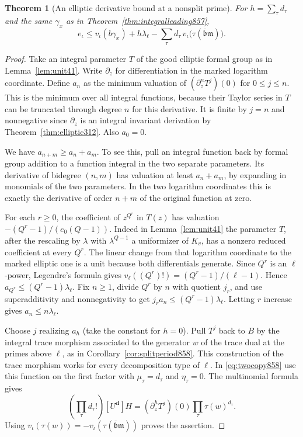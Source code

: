 \documentclass[a4paper,11pt]{article}
\newtheorem{theorem}[proposition]{Theorem}
\theoremstyle{definition}
\theoremstyle{remark}
\numberwithin{equation}{section}
\begin{document}
\begin{theorem}[An elliptic derivative bound at a nonsplit prime]
\leavevmode\label{thm:scalartrace859}
For \(h=\sum_\tau d_\tau\) and the same \(\gamma_x\) as in
Theorem~\ref{thm:integralleading857},
\[
 e_\iota\le v_\iota(b\gamma_x)+h\lambda_\ell
         -\sum_\tau d_\tau\,v_\iota
                 \bigl(\tau(\overline{\mathfrak b}\mathfrak m)\bigr).
\]
\end{theorem}
\begin{proof}
Take an integral parameter \(T\) of the good elliptic formal
group as in Lemma~\ref{lem:unit41}. Write \(\partial_z\) for
differentiation in the marked logarithm coordinate. Define \(a_n\)
as the minimum valuation of \((\partial_z^n T^j)(0)\) for
\(0\le j\le n\). This is the minimum over all integral functions,
because their Taylor series in \(T\) can be truncated through
degree \(n\) for this derivative. It is finite by \(j=n\) and
nonnegative since \(\partial_z\) is an integral invariant
derivation by Theorem~\ref{thm:elliptic312}. Also \(a_0=0\).

We have \(a_{n+m}\ge a_n+a_m\). To see this, pull an integral
function back by formal group addition to a function integral
in the two separate parameters. Its derivative of bidegree
\((n,m)\) has valuation at least \(a_n+a_m\), by expanding in
monomials of the two parameters. In the two logarithm coordinates
this is exactly the derivative of order \(n+m\) of the original
function at zero.

For each \(r\ge0\), the coefficient of \(z^{Q^r}\) in \(T(z)\)
has valuation \(-(Q^r-1)/(e_0(Q-1))\). Indeed in
Lemma~\ref{lem:unit41} the parameter \(T\), after the rescaling
by \(\lambda\) with \(\lambda^{Q-1}\) a uniformizer of \(K_v\),
has a nonzero reduced coefficient at every \(Q^r\). The linear
change from that logarithm coordinate to the marked elliptic
one is a unit because both differentials generate. Since \(Q^r\)
is an \(\ell\)-power, Legendre's formula gives
\(v_\ell((Q^r)!)=(Q^r-1)/(\ell-1)\). Hence
\(a_{Q^r}\le(Q^r-1)\lambda_\ell\). Fix \(n\ge1\), divide
\(Q^r\) by \(n\) with quotient \(j_r\), and use superadditivity
and nonnegativity to get \(j_r a_n\le (Q^r-1)\lambda_\ell\).
Letting \(r\) increase gives \(a_n\le n\lambda_\ell\).

Choose \(j\) realizing \(a_h\) (take the constant for \(h=0\)).
Pull \(T^j\) back to \(B\) by the integral trace morphism
associated to the generator \(w\) of the trace dual at the
primes above \(\ell\), as in Corollary~\ref{cor:splitperiod858}.
This construction of the trace morphism works for every
decomposition type of \(\ell\). In \eqref{eq:twocopy858}
use this function on the first factor with \(\mu_\tau=d_\tau\)
and \(\eta_\tau=0\). The multinomial formula gives
\[
       \left(\prod_\tau d_\tau!\right)[U^{\mathbf d}]H
           =(\partial_z^h T^j)(0)\prod_\tau\tau(w)^{d_\tau}.
\]
Using \(v_\iota(\tau(w))=-v_\iota
(\tau(\overline{\mathfrak b}\mathfrak m))\) proves the assertion.
\end{proof}
\end{document}
